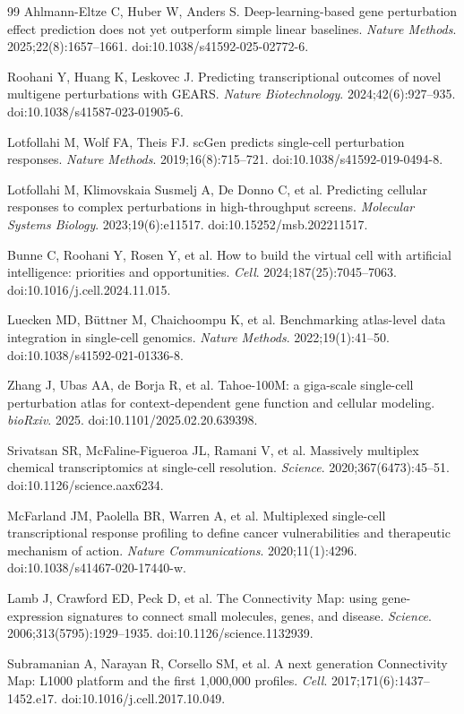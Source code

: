 \documentclass[12pt]{article}
\begin{document}
\begin{singlespace}
\begin{thebibliography}{99}
 Ahlmann-Eltze C, Huber W, Anders S. Deep-learning-based gene perturbation effect prediction does not yet outperform simple linear baselines. \textit{Nature Methods}. 2025;22(8):1657–1661. doi:10.1038/s41592-025-02772-6.

 Roohani Y, Huang K, Leskovec J. Predicting transcriptional outcomes of novel multigene perturbations with GEARS. \textit{Nature Biotechnology}. 2024;42(6):927–935. doi:10.1038/s41587-023-01905-6.

 Lotfollahi M, Wolf FA, Theis FJ. scGen predicts single-cell perturbation responses. \textit{Nature Methods}. 2019;16(8):715–721. doi:10.1038/s41592-019-0494-8.

 Lotfollahi M, Klimovskaia Susmelj A, De Donno C, et al. Predicting cellular responses to complex perturbations in high-throughput screens. \textit{Molecular Systems Biology}. 2023;19(6):e11517. doi:10.15252/msb.202211517.

 Bunne C, Roohani Y, Rosen Y, et al. How to build the virtual cell with artificial intelligence: priorities and opportunities. \textit{Cell}. 2024;187(25):7045–7063. doi:10.1016/j.cell.2024.11.015.

 Luecken MD, Büttner M, Chaichoompu K, et al. Benchmarking atlas-level data integration in single-cell genomics. \textit{Nature Methods}. 2022;19(1):41–50. doi:10.1038/s41592-021-01336-8.

 Zhang J, Ubas AA, de Borja R, et al. Tahoe-100M: a giga-scale single-cell perturbation atlas for context-dependent gene function and cellular modeling. \textit{bioRxiv}. 2025. doi:10.1101/2025.02.20.639398.

 Srivatsan SR, McFaline-Figueroa JL, Ramani V, et al. Massively multiplex chemical transcriptomics at single-cell resolution. \textit{Science}. 2020;367(6473):45–51. doi:10.1126/science.aax6234.

 McFarland JM, Paolella BR, Warren A, et al. Multiplexed single-cell transcriptional response profiling to define cancer vulnerabilities and therapeutic mechanism of action. \textit{Nature Communications}. 2020;11(1):4296. doi:10.1038/s41467-020-17440-w.

 Lamb J, Crawford ED, Peck D, et al. The Connectivity Map: using gene-expression signatures to connect small molecules, genes, and disease. \textit{Science}. 2006;313(5795):1929–1935. doi:10.1126/science.1132939.

 Subramanian A, Narayan R, Corsello SM, et al. A next generation Connectivity Map: L1000 platform and the first 1,000,000 profiles. \textit{Cell}. 2017;171(6):1437–1452.e17. doi:10.1016/j.cell.2017.10.049.


\end{thebibliography}
\end{singlespace}
\end{document}
